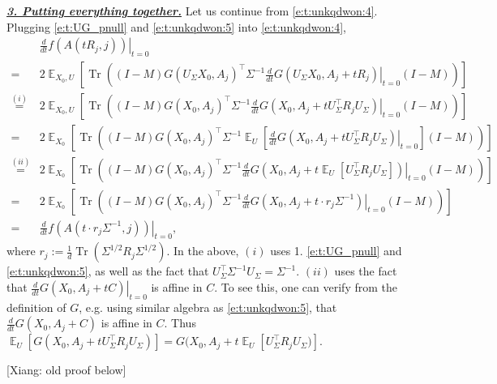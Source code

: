 \documentclass{article}
\DeclareMathOperator{\E}{\mathbb{E}}
\newcommand{\emphh}[1]{\textbf{\emph{#1}}}
\DeclareMathOperator{\tr}{Tr}
\newcommand*\lrb[1]{\left[ #1 \right]}
\newcommand*\lrp[1]{\left( #1 \right)}
\newcommand*\at[2]{\left.#1\right|_{#2}}
\newcommand{\US}{U_\Sigma}
\newcommand{\xc}[1]{{\color{black!2!green} [Xiang: #1]}}
\begin{document}
\underline{\emphh{3. Putting everything together.}} Let us continue from \eqref{e:t:unkqdwon:4}. Plugging \eqref{e:t:UG_pnull} and \eqref{e:t:unkqdwon:5} into \eqref{e:t:unkqdwon:4}, 
{\allowdisplaybreaks
\begin{align*}
& \at{\frac{d}{dt} f({A(tR_j,j)})}{t=0}\\
=& 2\E_{X_0, U} \lrb{\tr\lrp{\lrp{I-M} G(\US X_0, A_j )^\top \Sigma^{-1} \at{\frac{d}{dt} G(\US X_0, A_j + t R_j)}{t=0} \lrp{I-M}}}\\
\overset{(i)}{=}& 2\E_{X_0, U} \lrb{\tr\lrp{\lrp{I-M} G( X_0, A_j )^\top \Sigma^{-1} \at{\frac{d}{dt} G(X_0, A_j + t \US^{\top} R_j \US)}{t=0} \lrp{I-M}}}\\
=& 2\E_{X_0} \lrb{\tr\lrp{\lrp{I-M} G( X_0, A_j )^\top \Sigma^{-1} \E_{U}\lrb{\at{\frac{d}{dt} G(X_0, A_j + t \US^{\top} R_j \US)}{t=0}} \lrp{I-M}}}\\
\overset{(ii)}{=}& 2\E_{X_0} \lrb{\tr\lrp{\lrp{I-M} G( X_0, A_j )^\top \Sigma^{-1} \at{\frac{d}{dt} G(X_0, A_j + t \E_U\lrb{\US^{\top} R_j \US} )}{t=0} \lrp{I-M}}}\\
=& 2\E_{X_0} \lrb{\tr\lrp{\lrp{I-M} G( X_0, A_j )^\top \Sigma^{-1} \at{\frac{d}{dt} G(X_0, A_j + t \cdot r_j \Sigma^{-1})}{t=0} \lrp{I-M}}}\\
=& \at{\frac{d}{dt} f(A(t\cdot r_j \Sigma^{-1}, j))}{t=0},
\end{align*}
}
where $r_j := \frac{1}{d} \tr\lrp{\Sigma^{1/2} R_j \Sigma^{1/2}}$. In the above, $(i)$ uses 1. \eqref{e:t:UG_pnull} and \eqref{e:t:unkqdwon:5}, as well as the fact that $\US^\top \Sigma^{-1} \US = \Sigma^{-1}$. $(ii)$ uses the fact that $\at{\frac{d}{dt} G(X_0, A_j + t C)}{t=0}$ is affine in $C$. To see this, one can verify from the definition of $G$, e.g. using similar algebra as \eqref{e:t:unkqdwon:5}, that $\frac{d}{dt} G(X_0, A_j + C)$ is affine in $C$. Thus $\E_U\lrb{G(X_0, A_j + t \US^{\top} R_j \US)} = G(X_0, A_j + t \E_U\lrb{\US^{\top} R_j \US)}$. 

\iffalse
\newpage
\xc{old proof below}
\end{document}
